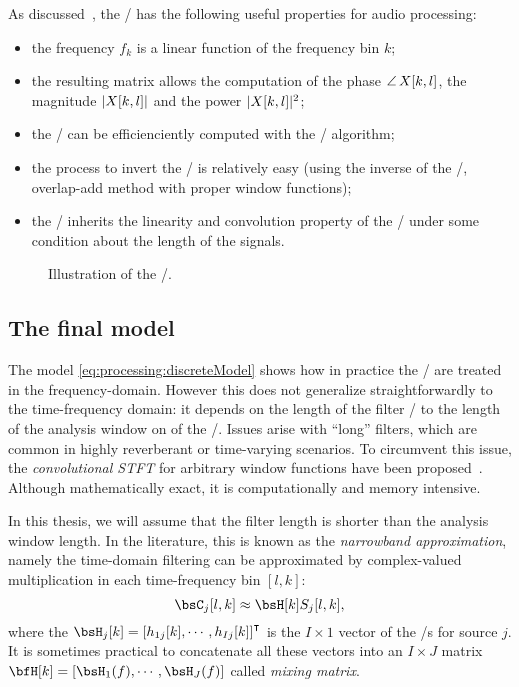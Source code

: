 \mynewline
As discussed~, the \STFT/ has the following useful properties for audio processing:
\begin{itemize}
    \item the frequency $f_k$ is a linear function of the frequency bin $k$;
    \item the resulting matrix allows the computation of the phase $\operatorname*{\angle}{X[k,l]}$, the magnitude $|{X[k,l]}|$ and the power $|{X[k,l]}|^2$;
    \item the \DFT/ can be efficienciently computed with the \FFT/ algorithm;
    \item the process to invert the \STFT/ is relatively easy (using the inverse of the \DFT/, overlap-add method with proper window functions);
    \item the \STFT/ inherits the linearity and convolution property of the \DFT/ under some condition about the length of the signals.
\end{itemize}

\begin{figure}[t]
    \begin{fullwidth}
    \centering
        
        \caption{Illustration of the \STFT/.}
    \end{fullwidth}
\end{figure}


\subsection{The final model}\label{subsec:processing:model:stft}
The model \eqref{eq:processing:discreteModel} shows how in practice the \RIRs/ are treated in the frequency-domain.
However this does not generalize straightforwardly to the time-frequency domain:
it depends on the length of the filter \wrt/ to the length of the analysis window on of the \STFT/.
Issues arise with ``long'' filters, which are common in highly reverberant or time-varying scenarios.
To circumvent this issue, the \textit{convolutional STFT} for arbitrary window functions have been proposed~.
Although mathematically exact, it is computationally and memory intensive.

\mynewline
In this thesis, we will assume that the filter length is shorter than the analysis window length.
In the literature, this is known as the \textit{narrowband approximation}, namely the time-domain filtering can be approximated by complex-valued multiplication in each time-frequency bin $[l,k]$:
\begin{equation}\label{eq:processing:narrow}
    \IMGS_j[l,k] \approx {\FLTS}[k] \SRC_j[l,k]
    ,
\end{equation}
where the ${\FLTS}_j[k] = \ktranspose{\klist{{\flt}_{1j}[k], \cdots, {\flt}_{Ij}[k]}}$ is the $I \times 1$ vector of the \RTF/s for source $j$.
It is sometimes practical to concatenate all these vectors into an $I \times J$ matrix ${\FLTSS}[k] = \klist{\FLTS_1(f),\cdots,\FLTS_J(f)}$ called \textit{mixing matrix}.

